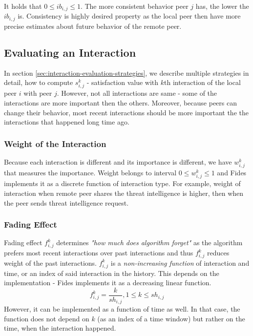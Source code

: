 It holds that $0 \leq ib_{i,j} \leq 1$.
The more consistent behavior peer $j$ has, the lower the $ib_{i,j}$ is. Consistency is highly desired property as the local peer then have more precise estimates about future behavior of the remote peer.

\subsection{Evaluating an Interaction}
\label{subsec:evaluating-an-interaction}
In section \ref{sec:interaction-evaluation-strategies}, we describe multiple strategies in detail, how to compute $s^{k}_{i,j}$ - satisfaction value with $k$th interaction of the local peer $i$ with peer $j$.
However, not all interactions are same - some of the interactions are more important then the others. 
Moreover, because peers can change their behavior, most recent interactions should be more important the the interactions that happened long time ago.

\subsubsection{Weight of the Interaction}
Because each interaction is different and its importance is different, we have $w^{k}_{i,j}$ that measures the importance.
Weight belongs to interval $0 \leq w^{k}_{i,j} \leq 1$ and Fides implements it as a discrete function of interaction type. 
For example, weight of interaction when remote peer shares the threat intelligence is higher, then when the peer sends threat intelligence request.


\subsubsection{Fading Effect}
Fading effect $f^{k}_{i,j}$ determines \textit{"how much does algorithm forget"} as the algorithm prefers most recent interactions over past interactions and thus $f^{k}_{i,j}$ reduces weight of the past interactions. 
$f^{k}_{i,j}$ is a \textit{non-increasing function} of interaction and time, or an index of said interaction in the history.
This depends on the implementation - Fides implements it as a decreasing linear function.
\begin{equation}
    f^{k}_{i,j} = \frac{k}{sh_{i,j}}, 1 \leq k \leq sh_{i,j}
\end{equation}
However, it can be implemented as a function of time as well. In that case, the function does not depend on $k$ (as an index of a time window) but rather on the time, when the interaction happened.

